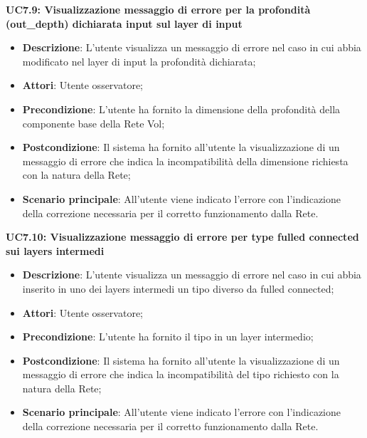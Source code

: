 \textbf{UC7.9: Visualizzazione messaggio di errore per la profondit\`a (out\_depth) dichiarata input sul layer di input}\mbox{}
\label{UC7.9: Visualizzazione messaggio di errore per la profondita dichiarata input sul layer di input}
\noindent
\begin{itemize}
\item \textbf{Descrizione}: L'utente visualizza un messaggio di errore nel caso in cui abbia modificato nel layer di input la profondit\`a dichiarata;
\item \textbf{Attori}: Utente osservatore;
\item \textbf{Precondizione}: L'utente ha fornito la dimensione della profondit\`a della componente base della Rete Vol;
\item \textbf{Postcondizione}: Il sistema ha fornito all'utente la visualizzazione di un messaggio di errore che indica la incompatibilit\`a della dimensione richiesta con la natura della Rete;
\item \textbf{Scenario principale}: All'utente viene indicato l'errore con l'indicazione della correzione necessaria per il corretto funzionamento dalla Rete.
\end{itemize}


\textbf{UC7.10: Visualizzazione messaggio di errore per type fulled connected sui layers intermedi}\mbox{}
\label{UC7.10: Visualizzazione messaggio di errore per type fulled connected sui layers intermedi}
\noindent
\begin{itemize}
\item \textbf{Descrizione}: L'utente visualizza un messaggio di errore nel caso in cui abbia inserito in uno dei layers intermedi un tipo diverso da fulled connected;
\item \textbf{Attori}: Utente osservatore;
\item \textbf{Precondizione}: L'utente ha fornito il tipo in un layer intermedio;
\item \textbf{Postcondizione}: Il sistema ha fornito all'utente la visualizzazione di un messaggio di errore che indica la incompatibilit\`a del tipo richiesto con la natura della Rete;
\item \textbf{Scenario principale}: All'utente viene indicato l'errore con l'indicazione della correzione necessaria per il corretto funzionamento dalla Rete.
\end{itemize}


